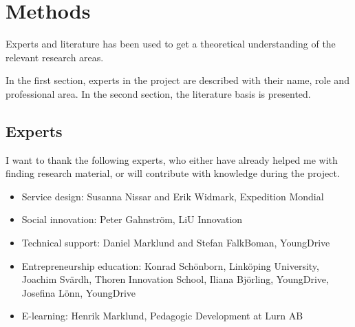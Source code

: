 \section{Methods}

Experts and literature has been used to get a theoretical understanding of the relevant research areas.

In the first section, experts in the project are described with their name, role and professional area. In the second section, the literature basis is presented.

\subsection{Experts}
I want to thank the following experts, who either have already helped me with finding research material, or will contribute with knowledge during the project.

\begin{itemize}
    \item Service design: Susanna Nissar and Erik Widmark, Expedition Mondial
  \item Social innovation: Peter Gahnström, LiU Innovation
    \item Technical support: Daniel Marklund and Stefan FalkBoman, YoungDrive
    \item Entrepreneurship education: Konrad Schönborn, Linköping University, Joachim Svärdh, Thoren Innovation School, Iliana Björling, YoungDrive, Josefina Lönn, YoungDrive
  \item E-learning: Henrik Marklund, Pedagogic Development at Lurn AB %
\end{itemize}
